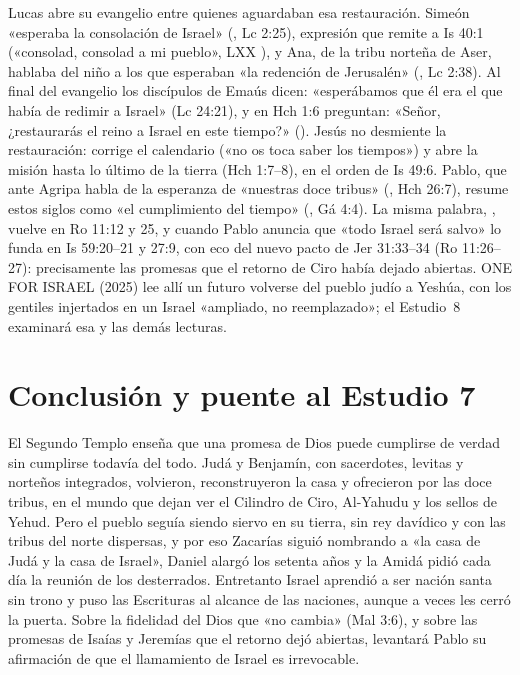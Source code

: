 Lucas abre su evangelio entre quienes aguardaban esa restauración. Simeón «esperaba la consolación de Israel» (, Lc 2:25), expresión que remite a Is 40:1 («consolad, consolad a mi pueblo», LXX ), y Ana, de la tribu norteña de Aser, hablaba del niño a los que esperaban «la redención de Jerusalén» (, Lc 2:38). Al final del evangelio los discípulos de Emaús dicen: «esperábamos que él era el que había de redimir a Israel» (Lc 24:21), y en Hch 1:6 preguntan: «Señor, ¿restaurarás el reino a Israel en este tiempo?» (). Jesús no desmiente la restauración: corrige el calendario («no os toca saber los tiempos») y abre la misión hasta lo último de la tierra (Hch 1:7--8), en el orden de Is 49:6. Pablo, que ante Agripa habla de la esperanza de «nuestras doce tribus» (, Hch 26:7), resume estos siglos como «el cumplimiento del tiempo» (, Gá 4:4). La misma palabra, , vuelve en Ro 11:12 y 25, y cuando Pablo anuncia que «todo Israel será salvo» lo funda en Is 59:20--21 y 27:9, con eco del nuevo pacto de Jer 31:33--34 (Ro 11:26--27): precisamente las promesas que el retorno de Ciro había dejado abiertas. ONE FOR ISRAEL (2025) lee allí un futuro volverse del pueblo judío a Yeshúa, con los gentiles injertados en un Israel «ampliado, no reemplazado»; el Estudio~8 examinará esa y las demás lecturas.

\section{Conclusión y puente al Estudio 7}

El Segundo Templo enseña que una promesa de Dios puede cumplirse de verdad sin cumplirse todavía del todo. Judá y Benjamín, con sacerdotes, levitas y norteños integrados, volvieron, reconstruyeron la casa y ofrecieron por las doce tribus, en el mundo que dejan ver el Cilindro de Ciro, Al-Yahudu y los sellos de Yehud. Pero el pueblo seguía siendo siervo en su tierra, sin rey davídico y con las tribus del norte dispersas, y por eso Zacarías siguió nombrando a «la casa de Judá y la casa de Israel», Daniel alargó los setenta años y la Amidá pidió cada día la reunión de los desterrados. Entretanto Israel aprendió a ser nación santa sin trono y puso las Escrituras al alcance de las naciones, aunque a veces les cerró la puerta. Sobre la fidelidad del Dios que «no cambia» (Mal 3:6), y sobre las promesas de Isaías y Jeremías que el retorno dejó abiertas, levantará Pablo su afirmación de que el llamamiento de Israel es irrevocable.

